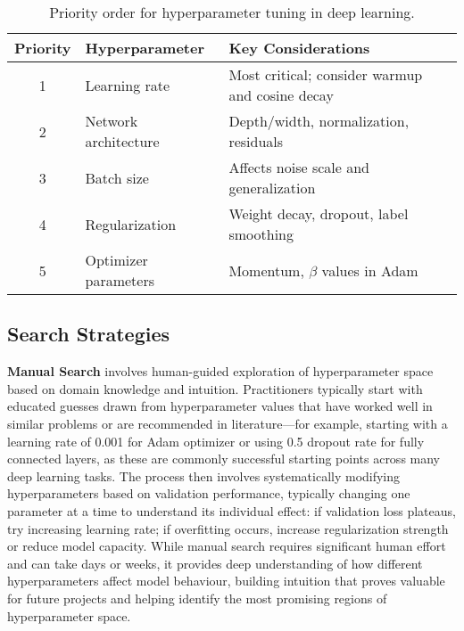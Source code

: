 \begin{table}[h]
\centering
\begin{tabular}{|c|p{}|p{}|}
\hline
\textbf{Priority} & \textbf{Hyperparameter} & \textbf{Key Considerations} \\
\hline
1 & Learning rate & Most critical; consider warmup and cosine decay \\
\hline
2 & Network architecture & Depth/width, normalization, residuals \\
\hline
3 & Batch size & Affects noise scale and generalization \\
\hline
4 & Regularization & Weight decay, dropout, label smoothing \\
\hline
5 & Optimizer parameters & Momentum, $\beta$ values in Adam \\
\hline
\end{tabular}
\caption{Priority order for hyperparameter tuning in deep learning.}
\label{tab:hyperparameter-priority}
\end{table}

\subsection{Search Strategies}

\textbf{Manual Search} involves human-guided exploration of hyperparameter space based on domain knowledge and intuition. Practitioners typically start with educated guesses drawn from hyperparameter values that have worked well in similar problems or are recommended in literature—for example, starting with a learning rate of 0.001 for Adam optimizer or using 0.5 dropout rate for fully connected layers, as these are commonly successful starting points across many deep learning tasks. The process then involves systematically modifying hyperparameters based on validation performance, typically changing one parameter at a time to understand its individual effect: if validation loss plateaus, try increasing learning rate; if overfitting occurs, increase regularization strength or reduce model capacity. While manual search requires significant human effort and can take days or weeks, it provides deep understanding of how different hyperparameters affect model behaviour, building intuition that proves valuable for future projects and helping identify the most promising regions of hyperparameter space.

